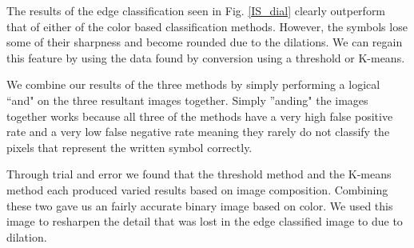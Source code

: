 
The results of the edge classification seen in Fig. \ref{IS_dial} clearly outperform that of either of the color based classification methods. However, the symbols lose some of their sharpness and become rounded due to the dilations. We can regain this feature by using the data found by conversion using a threshold or K-means.

We combine our results of the three methods by simply performing a logical ``and" on the three resultant images together. Simply ''anding" the images together works because all three of the methods have a very high false positive rate and a very low false negative rate meaning they rarely do not classify the pixels that represent the written symbol correctly. 


Through trial and error we found that the threshold method and the K-means method each produced varied results based on image composition. Combining these two gave us an fairly accurate binary image based on color. We used this image to resharpen the detail that was lost in the edge classified image to due to dilation.

